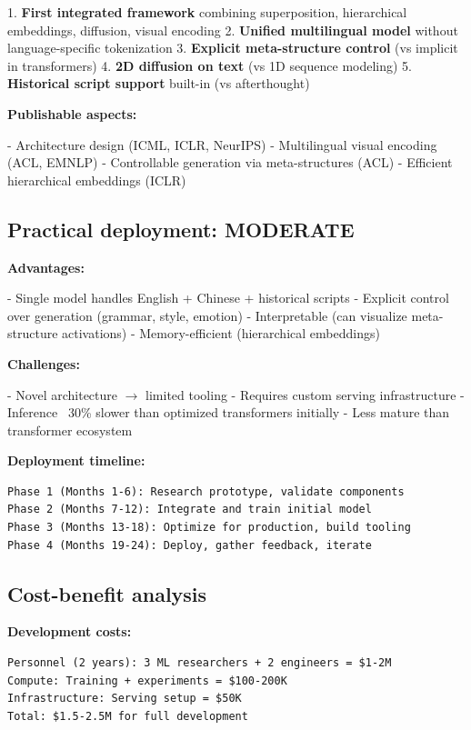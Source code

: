 \documentclass[11pt]{article}
\begin{document}
1. \textbf{First integrated framework} combining superposition, hierarchical embeddings, diffusion, visual encoding
2. \textbf{Unified multilingual model} without language-specific tokenization
3. \textbf{Explicit meta-structure control} (vs implicit in transformers)
4. \textbf{2D diffusion on text} (vs 1D sequence modeling)
5. \textbf{Historical script support} built-in (vs afterthought)

\textbf{Publishable aspects:}

- Architecture design (ICML, ICLR, NeurIPS)
- Multilingual visual encoding (ACL, EMNLP)
- Controllable generation via meta-structures (ACL)
- Efficient hierarchical embeddings (ICLR)

\subsection{Practical deployment: MODERATE}

\textbf{Advantages:}

- Single model handles English + Chinese + historical scripts
- Explicit control over generation (grammar, style, emotion)
- Interpretable (can visualize meta-structure activations)
- Memory-efficient (hierarchical embeddings)

\textbf{Challenges:}

- Novel architecture \(\to\) limited tooling
- Requires custom serving infrastructure
- Inference ~30\% slower than optimized transformers initially
- Less mature than transformer ecosystem

\textbf{Deployment timeline:}

\begin{verbatim}
Phase 1 (Months 1-6): Research prototype, validate components
Phase 2 (Months 7-12): Integrate and train initial model
Phase 3 (Months 13-18): Optimize for production, build tooling
Phase 4 (Months 19-24): Deploy, gather feedback, iterate
\end{verbatim}

\subsection{Cost-benefit analysis}

\textbf{Development costs:}

\begin{verbatim}
Personnel (2 years): 3 ML researchers + 2 engineers = $1-2M
Compute: Training + experiments = $100-200K
Infrastructure: Serving setup = $50K
Total: $1.5-2.5M for full development
\end{verbatim}
\end{document}
